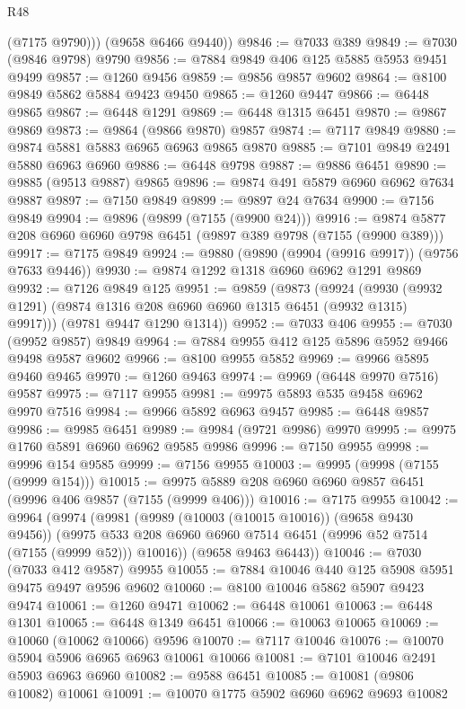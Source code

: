 \begin{lexlean}{R48}
\begin{coremodule}
          (@7175 @9790)))
      (@9658 @6466 @9440))
@9846 := @7033 @389
@9849 := @7030 (@9846 @9798) @9790
@9856 := @7884 @9849 @406 @125 @5885 @5953 @9451 @9499
@9857 := @1260 @9456
@9859 := @9856 @9857 @9602
@9864 := @8100 @9849 @5862 @5884 @9423 @9450
@9865 := @1260 @9447
@9866 := @6448 @9865
@9867 := @6448 @1291
@9869 := @6448 @1315 @6451
@9870 := @9867 @9869
@9873 := @9864 (@9866 @9870) @9857
@9874 := @7117 @9849
@9880 := @9874 @5881 @5883 @6965 @6963 @9865 @9870
@9885 := @7101 @9849 @2491 @5880 @6963 @6960
@9886 := @6448 @9798
@9887 := @9886 @6451
@9890 := @9885 (@9513 @9887) @9865
@9896 := @9874 @491 @5879 @6960 @6962 @7634 @9887
@9897 := @7150 @9849
@9899 := @9897 @24 @7634
@9900 := @7156 @9849
@9904 := @9896 (@9899 (@7155 (@9900 @24)))
@9916 := @9874 @5877 @208 @6960 @6960 @9798 @6451 (@9897 @389 @9798 (@7155 (@9900 @389)))
@9917 := @7175 @9849
@9924 := @9880 (@9890 (@9904 (@9916 @9917)) (@9756 @7633 @9446))
@9930 := @9874 @1292 @1318 @6960 @6962 @1291 @9869
@9932 := @7126 @9849 @125
@9951 := @9859
    (@9873
      (@9924 (@9930 (@9932 @1291) (@9874 @1316 @208 @6960 @6960 @1315 @6451 (@9932 @1315) @9917)))
      (@9781 @9447 @1290 @1314))
@9952 := @7033 @406
@9955 := @7030 (@9952 @9857) @9849
@9964 := @7884 @9955 @412 @125 @5896 @5952 @9466 @9498 @9587 @9602
@9966 := @8100 @9955 @5852
@9969 := @9966 @5895 @9460 @9465
@9970 := @1260 @9463
@9974 := @9969 (@6448 @9970 @7516) @9587
@9975 := @7117 @9955
@9981 := @9975 @5893 @535 @9458 @6962 @9970 @7516
@9984 := @9966 @5892 @6963 @9457
@9985 := @6448 @9857
@9986 := @9985 @6451
@9989 := @9984 (@9721 @9986) @9970
@9995 := @9975 @1760 @5891 @6960 @6962 @9585 @9986
@9996 := @7150 @9955
@9998 := @9996 @154 @9585
@9999 := @7156 @9955
@10003 := @9995 (@9998 (@7155 (@9999 @154)))
@10015 := @9975 @5889 @208 @6960 @6960 @9857 @6451 (@9996 @406 @9857 (@7155 (@9999 @406)))
@10016 := @7175 @9955
@10042 := @9964
    (@9974
      (@9981
        (@9989 (@10003 (@10015 @10016)) (@9658 @9430 @9456))
        (@9975 @533 @208 @6960 @6960 @7514 @6451 (@9996 @52 @7514 (@7155 (@9999 @52))) @10016))
      (@9658 @9463 @6443))
@10046 := @7030 (@7033 @412 @9587) @9955
@10055 := @7884 @10046 @440 @125 @5908 @5951 @9475 @9497 @9596 @9602
@10060 := @8100 @10046 @5862 @5907 @9423 @9474
@10061 := @1260 @9471
@10062 := @6448 @10061
@10063 := @6448 @1301
@10065 := @6448 @1349 @6451
@10066 := @10063 @10065
@10069 := @10060 (@10062 @10066) @9596
@10070 := @7117 @10046
@10076 := @10070 @5904 @5906 @6965 @6963 @10061 @10066
@10081 := @7101 @10046 @2491 @5903 @6963 @6960
@10082 := @9588 @6451
@10085 := @10081 (@9806 @10082) @10061
@10091 := @10070 @1775 @5902 @6960 @6962 @9693 @10082

\end{coremodule}
\end{lexlean}
